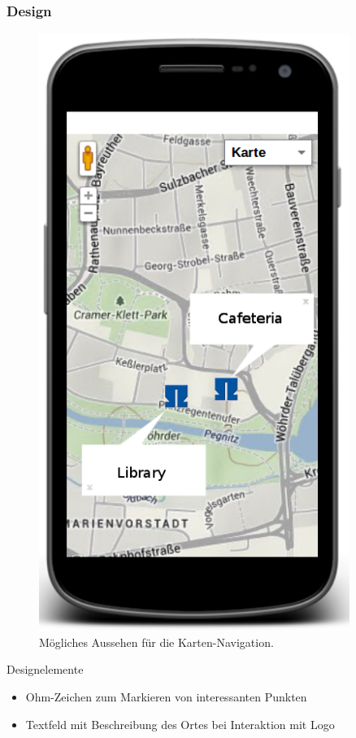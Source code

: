 \begin{frame}
\frametitle{Design}
	\begin{minipage}[c]{0.3\textwidth}
	\begin{figure}
		\includegraphics[width=0.9\textwidth]{../grafiken/map_gui.png}
		\caption{Mögliches Aussehen für die Karten-Navigation.}
	\end{figure} \vfill
	\end{minipage}
	\begin{minipage}[c]{0.65\textwidth}
	\begin{block}{Designelemente}
		\begin{itemize}
			\item Ohm-Zeichen zum Markieren von interessanten Punkten
			\item Textfeld mit Beschreibung des Ortes bei Interaktion mit Logo
		\end{itemize}
	\end{block}
	\end{minipage}
\end{frame}
